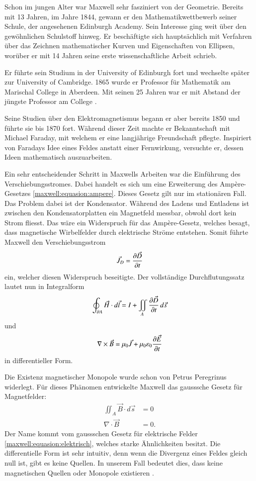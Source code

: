 Schon im jungen Alter war Maxwell sehr fasziniert von der Geometrie. Bereits mit 13 Jahren, im Jahre 1844, gewann er den Mathematikwettbewerb seiner Schule, der angesehenen Edinburgh Academy.
%
Sein Interesse ging weit über den gewöhnlichen Schulstoff hinweg.
Er beschäftigte sich hauptsächlich mit Verfahren über das Zeichnen mathematischer Kurven und Eigenschaften von Ellipsen, worüber er mit 14 Jahren seine erste wissenschaftliche Arbeit schrieb.

Er führte sein Studium in der University of Edinburgh fort und wechselte später zur University of Cambridge.
%
1865 wurde er Professor für Mathematik am Marischal College in Aberdeen.
%
%
Mit seinen 25 Jahren war er mit Abstand der jüngste Professor am College \cite{maxwell:maxwell}.

Seine Studien über den Elektromagnetismus begann er aber bereits 1850 und führte sie bis 1870 fort. 
Während dieser Zeit machte er Bekanntschaft mit Michael Faraday, mit welchem er eine langjährige Freundschaft pflegte.
Inspiriert von Faradays Idee eines Feldes anstatt einer Fernwirkung, versuchte er, dessen Ideen mathematisch auszuarbeiten.

Ein sehr entscheidender Schritt in Maxwells Arbeiten war die Einführung des Verschiebungsstromes.
%
Dabei handelt es sich um eine Erweiterung des Ampère-Gesetzes \eqref{maxwell:equasion:ampere}.
Dieses Gesetz gilt nur im stationären Fall.
Das Problem dabei ist der Kondensator.
%
Während des Ladens und Entladens ist zwischen den Kondensatorplatten ein Magnetfeld messbar, obwohl dort kein Strom fliesst.
Das wäre ein Widerspruch für das Ampère-Gesetz, welches besagt, dass magnetische Wirbelfelder durch elektrische Ströme entstehen.
Somit führte Maxwell den Verschiebungsstrom
\[
\vec{J}_D = \frac{\d \vec{D}}{\d t}
\]
ein, welcher diesen Widerspruch beseitigte.
Der vollständige Durchflutungssatz lautet nun in Integralform
\[
\oint_{\d A}
\vec{H}
\cdot
d\vec{l}
=
I
+
\iint_{A}
\frac{\d \vec{D}}{\d t} 
\,
d\vec{s}
\]
und 
\begin{equation}
\nabla
\times
\vec{B}
=
\mu_0 \vec{J}
+
\mu_0 \varepsilon_0 \frac{\d \vec{E}}{\d t}
\label{maxwell:equation:durchflutungssatz}
\end{equation}
in differentieller Form.

Die Existenz magnetischer Monopole wurde schon von Petrus Peregrinus widerlegt.
%
Für dieses Phänomen entwickelte Maxwell das gausssche Gesetz für Magnetfelder:
\begin{align*}
\iint_{A}
\vec{B} \cdot d\vec{s}
&=
0
\\
\nabla \cdot \vec{B} &= 0 .
\end{align*}
Der Name kommt vom gaussschen Gesetz für elektrische Felder \eqref{maxwell:equasion:elektrisch}, welches starke Ähnlichkeiten besitzt.
Die differentielle Form ist sehr intuitiv, denn wenn die Divergenz eines Feldes gleich null ist, gibt es keine Quellen. 
In unserem Fall bedeutet dies, dass keine magnetischen Quellen oder Monopole existieren \cite{maxwell:equasions}.

